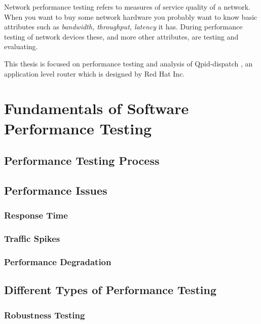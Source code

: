 Network performance testing refers to measures of service quality of a network. When you want to buy some network hardware you probably want to know basic attributes such as \textit{bandwidth, throughput, latency} it has. During performance testing of network devices these, and more other attributes, are testing and evaluating.

This thesis is focused on performance testing and analysis of Qpid-dispatch \cite{RH:Interconnect}, an application level router which is designed by Red Hat Inc. 


\chapter{Fundamentals of Software Performance Testing}

\section{Performance Testing Process}

\section{Performance Issues}

\subsection{Response Time}

\subsection{Traffic Spikes}

\subsection{Performance Degradation}

\section{Different Types of Performance Testing}

\subsection*{Robustness Testing}


